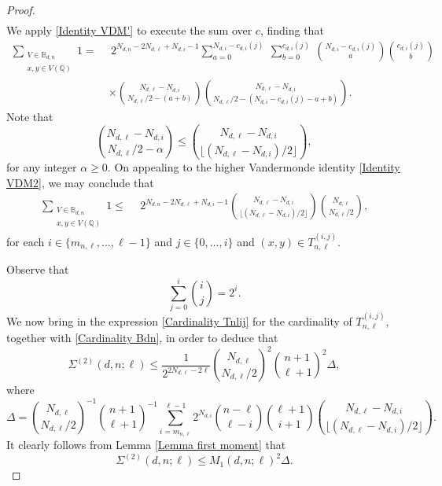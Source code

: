 \documentclass[10pt,a4paper]{amsart}
\renewcommand{\geq}{\geqslant}
\renewcommand{\leq}{\leqslant}
\begin{document}
\begin{proof}
\begin{align*}
\end{align*}
We apply  \eqref{Identity VDM'} to execute the sum over $c$, finding that 
\begin{align*}
\sum_{\substack{V \in \mathbb{B}_{d,n} \\ x, y \in V(\mathbb{Q})}} 1 =~ & \ 2^{N_{d,n}-2N_{d,\ell}+N_{d,i}-1} \sum_{a=0}^{N_{d,i}-c_{d,i}(j)} \ \sum_{b=0}^{c_{d,i}(j)}\
 \binom{N_{d,i}-c_{d,i}(j)}{a} \binom{c_{d,i}(j)}{b} \\
&\times
 \binom{N_{d,\ell}-N_{d,i}}{N_{d,\ell}/2-(a+b)} 
\binom{N_{d,\ell}-N_{d,i}}{N_{d,\ell}/2-\left(N_{d,i}-c_{d,i}(j)-a+b\right)} .
\end{align*}
Note that 
$$
\binom{N_{d,\ell}-N_{d,i}}{N_{d,\ell}/2-\alpha} 
\leq \binom{N_{d,\ell}-N_{d,i}}{
\lfloor (N_{d,\ell}-N_{d,i})/2\rfloor
},
$$
for any integer $\alpha\geq 0$.
On appealing to  the higher Vandermonde identity
\eqref{Identity VDM2}, we may conclude that 
\begin{align*}
\sum_{\substack{V \in \mathbb{B}_{d,n} \\ x, y \in V(\mathbb{Q})}} 1 \leq ~ & \ 2^{N_{d,n}-2N_{d,\ell}+N_{d,i}-1} 
\binom{N_{d,\ell}-N_{d,i}}{
\lfloor (N_{d,\ell}-N_{d,i})/2\rfloor
}
\binom{N_{d,\ell}}{
N_{d,\ell}/2},
\end{align*}
for each $i\in \{m_{n,\ell},\dots, \ell-1\}$ and  $j \in \{0, \dots, i\}$ and $(x, y) \in T_{n,\ell}^{(i,j)}$.

Observe that
$$
 \sum_{j=0}^i \binom{i}{j}=2^i.
$$
We now bring in the expression \eqref{Cardinality Tnlij} for the 
cardinality of $T_{n,\ell}^{(i,j)}$, together with \eqref{Cardinality Bdn}, in order to deduce that 
$$
\Sigma^{(2)}(d,n;\ell) \leq 
\frac{1}{2^{2N_{d,\ell}-2\ell}}\binom{N_{d,\ell}}{
N_{d,\ell}/2}^2\binom{n+1}{\ell+1}^2\Delta,
$$
where
$$
\Delta
=
\binom{N_{d,\ell}}{
N_{d,\ell}/2}^{-1}\binom{n+1}{\ell+1}^{-1}
 \sum_{i=m_{n,\ell}}^{\ell-1} 
 2^{N_{d,i}} 
 \binom{n-\ell}{\ell-i} \binom{\ell+1}{i+1} 
 \binom{N_{d,\ell}-N_{d,i}}{
\lfloor (N_{d,\ell}-N_{d,i})/2\rfloor
}.
$$
It clearly follows from Lemma \ref{Lemma first moment} that 
\begin{equation}\label{eq:leaf}
\Sigma^{(2)}(d,n;\ell) \leq 
M_1(d,n;\ell)^2
\Delta.
\end{equation}


\end{proof}
\end{document}
